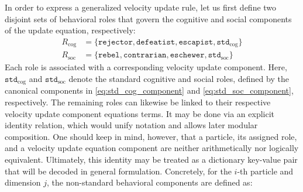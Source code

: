 {\enlargethispage{\baselineskip}
In order to express a generalized velocity update rule, let us first define two disjoint sets of behavioral roles that govern the cognitive and social components of the update equation, respectively:
\begin{align}
{R}_\text{cog} &= \{\texttt{rejector}, \texttt{defeatist}, \texttt{escapist}, \texttt{std}_\text{cog}\}\\
{R}_\text{soc} &= \{\texttt{rebel}, \texttt{contrarian}, \texttt{eschewer}, \texttt{std}_\text{soc}\}
\end{align}
Each role is associated with a corresponding velocity update component. Here, $\texttt{std}_\text{cog}$ and $\texttt{std}_\text{soc}$ denote the standard cognitive and social roles, defined by the canonical components in \eqref{eq:std_cog_component} and \eqref{eq:std_soc_component}, respectively. The remaining roles can likewise be linked to their respective velocity update component equations terms. It may be done via an explicit identity relation, which would unify notation and allows later modular composition. One should keep in mind, however, that a particle, its assigned role, and a velocity update equation component are neither arithmetically nor logically equivalent. Ultimately, this identity may be treated  as a dictionary key-value pair that will be decoded in general formulation. Concretely, for the $i$-th particle and dimension  $j$, the non-standard behavioral components are defined as:
}
